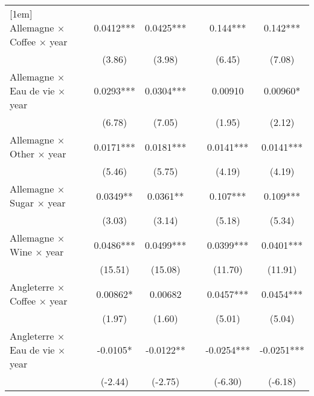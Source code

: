 {\begin{tabular}{l*{6}{c}}
[1em]
Allemagne $\times$ Coffee $\times$ year&                     &      0.0412***&      0.0425***&                     &       0.144***&       0.142***\\
                    &                     &      (3.86)         &      (3.98)         &                     &      (6.45)         &      (7.08)         \\
[1em]
Allemagne $\times$ Eau de vie $\times$ year&                     &      0.0293***&      0.0304***&                     &     0.00910         &     0.00960*  \\
                    &                     &      (6.78)         &      (7.05)         &                     &      (1.95)         &      (2.12)         \\
[1em]
Allemagne $\times$ Other $\times$ year&                     &      0.0171***&      0.0181***&                     &      0.0141***&      0.0141***\\
                    &                     &      (5.46)         &      (5.75)         &                     &      (4.19)         &      (4.19)         \\
[1em]
Allemagne $\times$ Sugar $\times$ year&                     &      0.0349** &      0.0361** &                     &       0.107***&       0.109***\\
                    &                     &      (3.03)         &      (3.14)         &                     &      (5.18)         &      (5.34)         \\
[1em]
Allemagne $\times$ Wine $\times$ year&                     &      0.0486***&      0.0499***&                     &      0.0399***&      0.0401***\\
                    &                     &     (15.51)         &     (15.08)         &                     &     (11.70)         &     (11.91)         \\
[1em]
Angleterre $\times$ Coffee $\times$ year&                     &     0.00862*  &     0.00682         &                     &      0.0457***&      0.0454***\\
                    &                     &      (1.97)         &      (1.60)         &                     &      (5.01)         &      (5.04)         \\
[1em]
Angleterre $\times$ Eau de vie $\times$ year&                     &     -0.0105*  &     -0.0122** &                     &     -0.0254***&     -0.0251***\\
                    &                     &     (-2.44)         &     (-2.75)         &                     &     (-6.30)         &     (-6.18)         \\

\end{tabular}}
